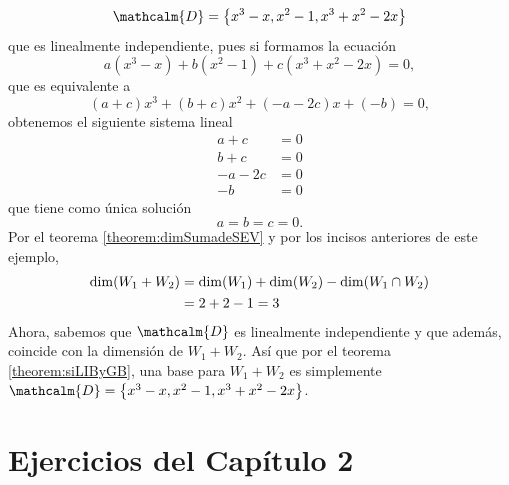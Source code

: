 \begin{examplebox}{}{}
\begin{enumerate}[label=\alph*), topsep=6pt, itemsep=0pt]
        $$\mathcalm{D} = \left\{ x^3 - x, x^2 - 1, x^3 + x^2 - 2x \right\}$$
        que es linealmente independiente, pues si formamos la ecuación
        $$a\left(x^3 - x\right) + b\left(x^2 - 1\right) + c\left(x^3 + x^2 - 2x\right) = 0,$$
        que es equivalente a
        $$(a + c)x^3 + (b + c)x^2 + (-a - 2c)x + (-b) = 0,$$
        obtenemos el siguiente sistema lineal
        \begin{align*}
            a + c & = 0 \\
            b + c & = 0 \\
            -a - 2c & = 0 \\
            -b & = 0
        \end{align*}
        que tiene como única solución
        $$a = b = c = 0.$$
        Por el teorema \ref{theorem:dimSumadeSEV} y por los incisos anteriores de este ejemplo,
        \begin{align*}
            \operatorname{dim}(W_1 + W_2) & = \operatorname{dim}(W_1) + \operatorname{dim}(W_2) - \operatorname{dim}(W_1 \cap W_2) \\
            & = 2 + 2 - 1 = 3
        \end{align*}
        Ahora, sabemos que $\mathcalm{D}$ es linealmente independiente y que además, coincide con la dimensión de $W_1 + W_2$. Así que por el teorema \ref{theorem:siLIByGB}, una base para $W_1 + W_2$ es simplemente $\mathcalm{D} = \left\{ x^3 - x, x^2 - 1, x^3 + x^2 - 2x \right\}$.
    \end{enumerate}
\end{examplebox}

\newpage

\section{Ejercicios del Capítulo 2}


